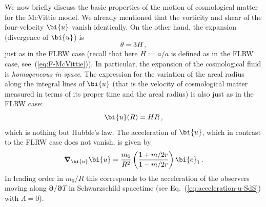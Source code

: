 \documentclass
[rmp,aps,twocolumn,showpacs,preprintnumbers,amsmath,amssymb]{revtex4}
\theoremstyle{plain}
\theoremstyle{definition}
\theoremstyle{remark}
\newcommand{\bpartial}{\boldsymbol{\partial}} %
\newcommand{\bnabla}{\boldsymbol{\nabla}}     %
\newcommand{\be}{\bi{e}}
\newcommand{\bu}{\bi{u}}
\begin{document}
We now briefly discuss the basic properties of the motion of cosmological 
matter for the McVittie model. We already mentioned that the vorticity and 
shear of the four-velocity $\bu$ vanish identically. On the other hand, the 
expansion (divergence of $\bu$) is 
%
\begin{equation}\label{eq:expansion-McVittie}
  \theta = 3 H\,,
\end{equation}
%
just as in the FLRW case (recall that here $H:=\dot a/a$ is defined as in 
the FLRW case, see~(\ref{eq:F-McVittie})). In particular, the 
expansion of the cosmological fluid is \emph{homogeneous in space}. 
The expression for the variation of the areal radius along the 
integral lines of $\bu$ (that is the velocity of cosmological 
matter measured in terms of its proper time and the areal 
radius) is also just as in the FLRW case:  
%
\begin{equation}\label{eq:Hubble-law-McVittie}
  \bu(R) = HR \,,
\end{equation}
%
which is nothing but Hubble's law. The acceleration of $\bu$, which in 
contrast to the FLRW case does not vanish, is given by 
%
\begin{equation}\label{eq:accel-McVittie}
  \bnabla_\bu\bu = \frac{m_0}{R^2} \left(\frac{1+m/2r}{1-m/2r}\right) \be_1\,.
\end{equation}
%
In leading order in $m_0/R$ this corresponds to the acceleration of the 
observers moving along $\bpartial/\bpartial T$ in Schwarzschild spacetime 
(see Eq.~(\ref{eq:acceleration-u-SdS}) with $\Lambda=0$). 
\end{document}
